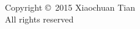 \begin{center}
  \vspace*{\fill}
Copyright \copyright \ 2015 Xiaochuan Tian
\\All rights reserved
  \vspace*{\fill}
\end{center}

